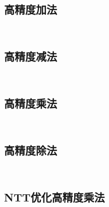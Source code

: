 \documentclass[twocolumn,a4]{article}
\begin{document}
\subsection{高精度加法}
\begin{lstlisting}
    
\end{lstlisting}

\subsection{高精度减法}
\begin{lstlisting}
    
\end{lstlisting}

\subsection{高精度乘法}
\begin{lstlisting}
    
\end{lstlisting}

\subsection{高精度除法}
\begin{lstlisting}
    
\end{lstlisting}

\subsection{NTT优化高精度乘法}
\begin{lstlisting}
    
\end{lstlisting}

\clearpage
\pagestyle{empty}
\phantom{s}
\clearpage
\end{document}

